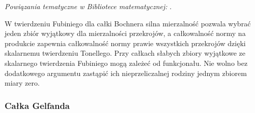 \noindent\emph{Powiązania tematyczne w Bibliotece matematycznej:} .


W twierdzeniu Fubiniego dla całki Bochnera silna mierzalność
pozwala wybrać jeden zbiór wyjątkowy dla mierzalności
przekrojów, a całkowalność normy na produkcie zapewnia
całkowalność normy prawie wszystkich przekrojów dzięki
skalarnemu twierdzeniu Tonellego.
Przy całkach słabych zbiory wyjątkowe ze skalarnego
twierdzenia Fubiniego mogą zależeć od funkcjonału.
Nie wolno bez dodatkowego argumentu zastąpić ich
nieprzeliczalnej rodziny jednym zbiorem miary zero.

\subsubsection{Całka Gelfanda}

